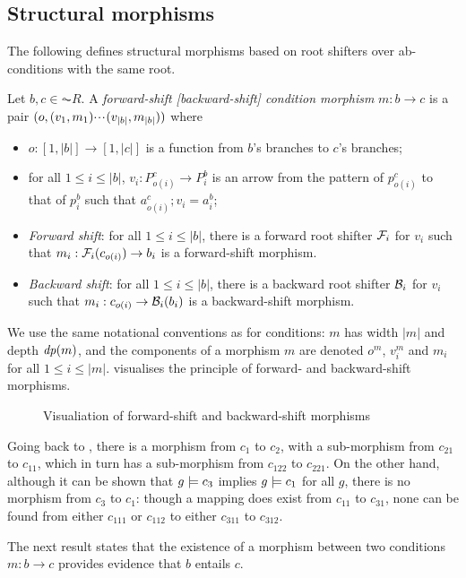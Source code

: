 \subsection{Structural morphisms}

The following defines structural morphisms based on root shifters over ab-conditions with the same root.

\begin{definition}
  Let $b,c \in \AC{R}$. A \emph{forward-shift [backward-shift] condition morphism} $m: b \to c$ is a pair $(o,(v_1,m_1){\cdotp\mkern-2mu\cdotp\mkern-2mu\cdotp\mkern1mu} (v_{|b|},m_{|b|}))$ where
  \begin{itemize}[topsep=\smallskipamount]
  \item $o:[1,|b|]\to[1,|c|]$ is a function from $b$'s branches to $c$'s branches;
  \item for all $1\leq i\leq |b|$, $v_i:P^c_{o(i)}\to P^b_i$ is an arrow from the pattern of $p^c_{o(i)}$ to that of $p^b_i$ such that $a^c_{o(i)};v_i=a^b_i$;
  \item\emph{Forward shift}: for all $1\leq i\leq |b|$, there is a forward root shifter $\mathcal{F}_i$ for $v_i$ such that $m_i:\mathcal{F}_i(c_{o(i)})\rightarrow b_i$ is a forward-shift morphism.
  \item\emph{Backward shift}: for all $1\leq i\leq |b|$, there is a backward root shifter $\mathcal{B}_i$ for $v_i$ such that $m_i:c_{o(i)}\rightarrow \mathcal{B}_i(b_i)$ is a backward-shift morphism.
  \end{itemize}
\end{definition}
%
We use the same notational conventions as for conditions: $m$ has width $|m|$ and depth $\mathit{dp}(m)$, and the components of a morphism $m$ are denoted $o^m$, $v^m_i$ and $m_i$ for all $1\leq i\leq |m|$.  visualises the principle of forward- and backward-shift morphisms.
%
\begin{figure}[t]
\centering

\caption{Visualiation of forward-shift and backward-shift morphisms}
\end{figure}

\begin{example}
Going back to , there is a morphism from $c_1$ to $c_2$, with a sub-morphism from $c_{21}$ to $c_{11}$, which in turn has a sub-morphism from $c_{122}$ to $c_{221}$. On the other hand, although it can be shown that $g\models c_3$ implies $g\models c_1$ for all $g$, there is no morphism from $c_3$ to $c_1$: though a mapping does exist from $c_{11}$ to $c_{31}$, none can be found from either $c_{111}$ or $c_{112}$ to either $c_{311}$ to $c_{312}$.
\end{example}
%
The next result states that the existence of a morphism between two conditions $m: b \to c$ provides evidence that $b$ entails $c$.


